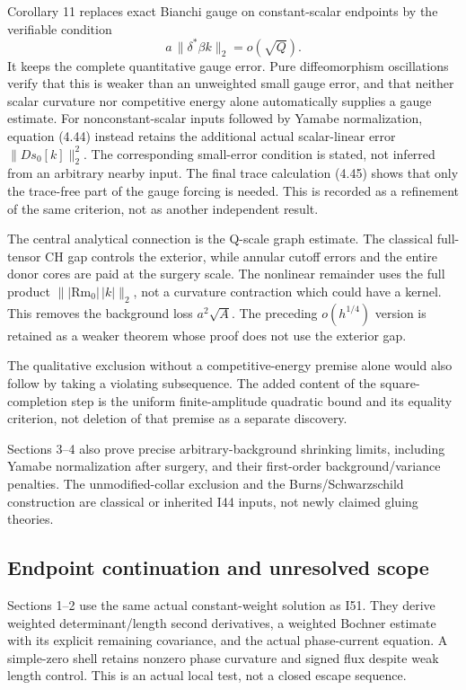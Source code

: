 \documentclass[
  10pt,
]{article}
\begin{document}
Corollary 11 replaces exact Bianchi gauge on constant-scalar endpoints
by the verifiable condition \[
a\,\|\delta^*\beta k\|_2=o(\sqrt Q).
\] It keeps the complete quantitative gauge error. Pure diffeomorphism
oscillations verify that this is weaker than an unweighted small gauge
error, and that neither scalar curvature nor competitive energy alone
automatically supplies a gauge estimate. For nonconstant-scalar inputs
followed by Yamabe normalization, equation (4.44) instead retains the
additional actual scalar-linear error \(\|Ds_0[k]\|_2^2\). The
corresponding small-error condition is stated, not inferred from an
arbitrary nearby input. The final trace calculation (4.45) shows that
only the trace-free part of the gauge forcing is needed. This is
recorded as a refinement of the same criterion, not as another
independent result.

The central analytical connection is the Q-scale graph estimate. The
classical full-tensor CH gap controls the exterior, while annular cutoff
errors and the entire donor cores are paid at the surgery scale. The
nonlinear remainder uses the full product
\(\||\mathrm{Rm}_0|\,|k|\|_2\), not a curvature contraction which could
have a kernel. This removes the background loss \(a^2\sqrt A\). The
preceding \(o(h^{1/4})\) version is retained as a weaker theorem whose
proof does not use the exterior gap.

The qualitative exclusion without a competitive-energy premise alone
would also follow by taking a violating subsequence. The added content
of the square-completion step is the uniform finite-amplitude quadratic
bound and its equality criterion, not deletion of that premise as a
separate discovery.

Sections 3--4 also prove precise arbitrary-background shrinking limits,
including Yamabe normalization after surgery, and their first-order
background/variance penalties. The unmodified-collar exclusion and the
Burns/Schwarzschild construction are classical or inherited I44 inputs,
not newly claimed gluing theories.

\hypertarget{endpoint-continuation-and-unresolved-scope}{%
\subsection{Endpoint continuation and unresolved
scope}\label{endpoint-continuation-and-unresolved-scope}}

Sections 1--2 use the same actual constant-weight solution as I51. They
derive weighted determinant/length second derivatives, a weighted
Bochner estimate with its explicit remaining covariance, and the actual
phase-current equation. A simple-zero shell retains nonzero phase
curvature and signed flux despite weak length control. This is an actual
local test, not a closed escape sequence.
\end{document}
